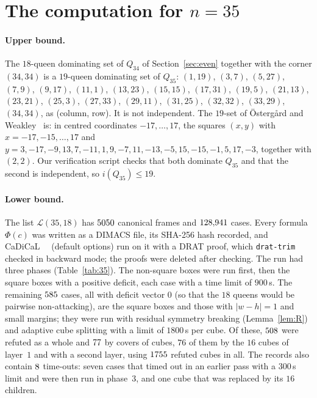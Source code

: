 \documentclass[11pt]{article}
\theoremstyle{definition}
\theoremstyle{remark}
\begin{document}
\section{The computation for \texorpdfstring{$n=35$}{n=35}}\label{sec:n35}

\paragraph{Upper bound.} The $18$-queen dominating set of $Q_{34}$ of Section~\ref{sec:even} together with
the corner $(34,34)$ is a $19$-queen dominating set of $Q_{35}$:
$(1,19)$, $(3,7)$, $(5,27)$, $(7,9)$, $(9,17)$, $(11,1)$, $(13,23)$, $(15,15)$, $(17,31)$, $(19,5)$,
$(21,13)$, $(23,21)$, $(25,3)$, $(27,33)$, $(29,11)$, $(31,25)$, $(32,32)$, $(33,29)$, $(34,34)$, as
(column, row). It is not independent. The $19$-set of \"Osterg\aa rd and Weakley~\cite[\S5]{OW} is: in
centred coordinates $-17,\dots,17$, the squares $(x,y)$ with $x=-17,-15,\dots,17$ and
$y=3,-17,-9,13,7,-11,1,9,-7,11,-13,-5,15,-15,-1,5,17,-3$, together with $(2,2)$. Our verification script
checks that both dominate $Q_{35}$ and that the second is independent, so $i(Q_{35})\le19$.

\paragraph{Lower bound.} The list $\mathcal L(35,18)$ has $5050$ canonical frames and
$128{,}941$ cases. Every formula $\Phi(c)$ was written as a DIMACS file, its SHA-256 hash recorded,
and CaDiCaL~\clcadicalVersion~\cite{CaDiCaL} (default options) run on it with a DRAT proof, which
\texttt{drat-trim} checked in backward mode; the proofs were deleted after checking. The run had three
phases (Table~\ref{tab:35}). The non-square boxes were run first, then the square boxes with a positive
deficit, each case with a time limit of $900$\,s. The remaining $585$ cases, all with
deficit vector $0$ (so that the $18$ queens would be pairwise non-attacking), are the square boxes and
those with $|w-h|=1$ and small margins; they were run with residual symmetry breaking
(Lemma~\ref{lem:R}) and adaptive cube splitting with a limit of $1800$\,s per cube. Of these,
$508$ were refuted as a whole and $77$ by covers of cubes, $76$ of them by the
$16$ cubes of layer~$1$ and \clsecondLayerXXXV{} with a second layer, using $1755$ refuted cubes in
all. The records also contain $8$ time-outs: seven cases that timed out in an earlier pass
with a $300$\,s limit and were then run in phase~3, and one cube that was replaced by its $16$ children.
\end{document}
